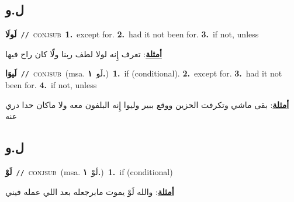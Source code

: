 \documentclass[10pt,a4paper,twoside]{article} %
\begin{document}
\begin{multicols}{2}
\vspace{-3mm}
\subsection*{\color{blue}\foreignlanguage{arabic}{ل.و}\color{blue}{}} 

{\setlength\topsep{0pt}\textbf{\foreignlanguage{arabic}{لَولَا}}\ {\color{gray}\texttt{//}\color{black}}\ \textsc{conj\textunderscore sub}\ \textbf{1.}~except for.  \textbf{2.}~had it not been for.  \textbf{3.}~if not, unless\  \begin{flushright}\color{gray}\foreignlanguage{arabic}{\textbf{\underline{\foreignlanguage{arabic}{أمثلة}}}: تعرف إِنه لولا لطف ربنا ولّا كان راح فيها}\end{flushright}\color{black}} \vspace{2mm}

{\setlength\topsep{0pt}\textbf{\foreignlanguage{arabic}{لَيوَا}}\ {\color{gray}\texttt{//}\color{black}}\ \textsc{conj\textunderscore sub}\ \color{gray}(msa. \foreignlanguage{arabic}{لَو}~\foreignlanguage{arabic}{\textbf{١.}})\color{black}\ \textbf{1.}~if (conditional).  \textbf{2.}~except for.  \textbf{3.}~had it not been for.  \textbf{4.}~if not, unless\  \begin{flushright}\color{gray}\foreignlanguage{arabic}{\textbf{\underline{\foreignlanguage{arabic}{أمثلة}}}: بقى ماشي وتكرفت الحزين ووقع ببير وليوا إِنه البلفون معه ولا ماكان حدا دري عنه}\end{flushright}\color{black}} \vspace{2mm}

\vspace{-3mm}
\subsection*{\color{blue}\foreignlanguage{arabic}{ل.و}\color{blue}{ (ntws)}} 

{\setlength\topsep{0pt}\textbf{\foreignlanguage{arabic}{لَوْ}}\ {\color{gray}\texttt{//}\color{black}}\ \textsc{conj\textunderscore sub}\ \color{gray}(msa. \foreignlanguage{arabic}{لَوْ}~\foreignlanguage{arabic}{\textbf{١.}})\color{black}\ \textbf{1.}~if (conditional)\  \begin{flushright}\color{gray}\foreignlanguage{arabic}{\textbf{\underline{\foreignlanguage{arabic}{أمثلة}}}: والله لَوْ يموت مابرجعله بعد اللي عمله فيني}\end{flushright}\color{black}} \vspace{2mm}


\end{multicols}
\end{document}
